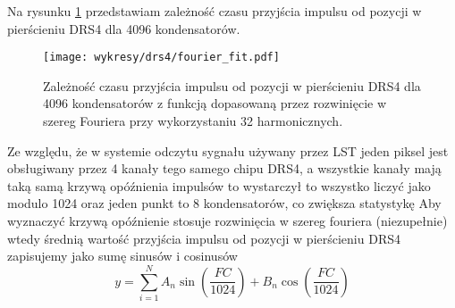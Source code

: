 \documentclass[a4paper,11pt,twoside]{article}
\begin{document}
Na rysunku \ref{fig:fourier_fit_4096} przedstawiam zależność czasu przyjścia impulsu od pozycji w pierścieniu DRS4 dla 4096 kondensatorów.
\begin{figure}[H] 
\centering
\texttt{[image: wykresy/drs4/fourier\_fit.pdf]}
\caption{Zależność czasu przyjścia impulsu od pozycji w pierścieniu DRS4 dla 4096 kondensatorów z funkcją dopasowaną przez rozwinięcie w szereg Fouriera przy wykorzystaniu 32 harmonicznych.}
\label{fig:fourier_fit_4096}
\end{figure}
 Ze względu, że w systemie odczytu sygnału używany przez LST jeden piksel jest obsługiwany przez 4 kanały tego samego chipu DRS4, a wszystkie kanały mają taką samą krzywą opóźnienia impulsów to wystarczył to wszystko liczyć jako modulo 1024 oraz jeden punkt to 8 kondensatorów, co zwiększa statystykę
Aby wyznaczyć krzywą opóźnienie stosuje rozwinięcia w szereg fouriera (niezupełnie) wtedy
średnią wartość przyjścia impulsu od pozycji w pierścieniu DRS4 zapisujemy jako sumę sinusów i cosinusów
\begin{equation}
y = \sum_{i=1}^{N} A_n \sin \left( \frac{FC}{1024} \right) + B_n \cos \left( \frac{FC}{1024} \right)
\end{equation}
\end{document}
